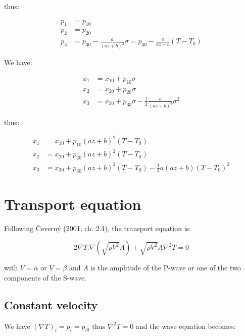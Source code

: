 \documentclass[main.tex]{subfiles}
\begin{document}
thus:

\begin{equation}
\begin{split}
p_1 & = p_{10} \\
p_2 & = p_{20} \\
p_3 & = p_{30} - \frac{a}{(a z + b)^3} \sigma = p_{30} - \frac{a}{a z + b} (T - T_0)
\end{split}
\end{equation}

We have:

\begin{equation}
\begin{split}
x_1 & = x_{10} + p_{10} \sigma \\
x_2 & = x_{20} + p_{20} \sigma \\
x_3 & = x_{30} + p_{30} \sigma - \frac{1}{2} \frac{a}{(a z + b)^3} \sigma^2
\end{split}
\end{equation}

thus:

\begin{equation}
\begin{split}
x_1 & = x_{10} + p_{10} (a z + b)^2 (T - T_0) \\
x_2 & = x_{20} + p_{20} (a z + b)^2 (T - T_0) \\
x_3 & = x_{30} + p_{30} (a z + b)^2 (T - T_0) - \frac{1}{2} a (a z + b) (T - T_0)^2
\end{split}
\end{equation}

\section{Transport equation}

Following \v Cevern\'y (2001, ch. 2.4), the transport equation is:

\begin{equation}
2 \nabla T . \nabla (\sqrt{\rho V^2} A) + \sqrt{\rho V^2} A \nabla^2 T = 0
\end{equation}

with $V = \alpha$ or $V= \beta$ and $A$ is the amplitude of the P-wave or one of the two components of the S-wave.

\subsection{Constant velocity}

We have $(\nabla T)_i = p_i = p_{i0}$ thus $\nabla^2 T = 0$ and the wave equation becomes:
\end{document}
